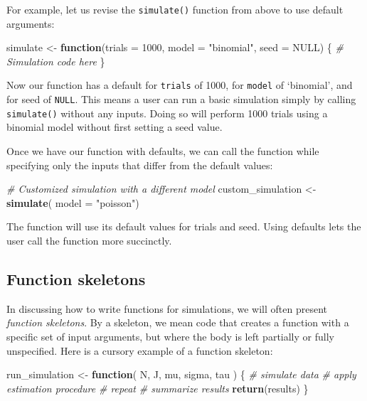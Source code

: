 \documentclass[
]{book}
\newenvironment{Shaded}{\begin{snugshade}}{\end{snugshade}}
\newcommand{\AttributeTok}[1]{\textcolor[rgb]{0.13,0.29,0.53}{#1}}
\newcommand{\CommentTok}[1]{\textcolor[rgb]{0.56,0.35,0.01}{\textit{#1}}}
\newcommand{\ConstantTok}[1]{\textcolor[rgb]{0.56,0.35,0.01}{#1}}
\newcommand{\ControlFlowTok}[1]{\textcolor[rgb]{0.13,0.29,0.53}{\textbf{#1}}}
\newcommand{\DecValTok}[1]{\textcolor[rgb]{0.00,0.00,0.81}{#1}}
\newcommand{\FunctionTok}[1]{\textcolor[rgb]{0.13,0.29,0.53}{\textbf{#1}}}
\newcommand{\NormalTok}[1]{#1}
\newcommand{\OtherTok}[1]{\textcolor[rgb]{0.56,0.35,0.01}{#1}}
\newcommand{\StringTok}[1]{\textcolor[rgb]{0.31,0.60,0.02}{#1}}
\begin{document}
For example, let us revise the \texttt{simulate()} function from above to use default arguments:

\begin{Shaded}
\begin{Highlighting}[]
\NormalTok{simulate }\OtherTok{\textless{}{-}} \ControlFlowTok{function}\NormalTok{(}\AttributeTok{trials =} \DecValTok{1000}\NormalTok{, }\AttributeTok{model =} \StringTok{"binomial"}\NormalTok{, }\AttributeTok{seed =} \ConstantTok{NULL}\NormalTok{) \{}
  \CommentTok{\# Simulation code here}
\NormalTok{\}}
\end{Highlighting}
\end{Shaded}

Now our function has a default for \texttt{trials} of 1000, for \texttt{model} of `binomial', and for seed of \texttt{NULL}.
This means a user can run a basic simulation simply by calling \texttt{simulate()} without any inputs. Doing so will perform 1000 trials using a binomial model without first setting a seed value.

Once we have our function with defaults, we can call the function while specifying only the inputs that differ from the default values:

\begin{Shaded}
\begin{Highlighting}[]
\CommentTok{\# Customized simulation with a different model}
\NormalTok{custom\_simulation }\OtherTok{\textless{}{-}} \FunctionTok{simulate}\NormalTok{( }\AttributeTok{model =} \StringTok{"poisson"}\NormalTok{)}
\end{Highlighting}
\end{Shaded}

The function will use its default values for trials and seed.
Using defaults lets the user call the function more succinctly.

\subsection{Function skeletons}\label{function-skeletons}

In discussing how to write functions for simulations, we will often present \emph{function skeletons}. By a skeleton, we mean code that creates a function with a specific set of input arguments, but where the body is left partially or fully unspecified.
Here is a cursory example of a function skeleton:

\begin{Shaded}
\begin{Highlighting}[]
\NormalTok{run\_simulation }\OtherTok{\textless{}{-}} \ControlFlowTok{function}\NormalTok{( N, J, mu, sigma, tau ) \{}
  \CommentTok{\# simulate data}
  \CommentTok{\# apply estimation procedure}
  \CommentTok{\# repeat}
  \CommentTok{\# summarize results}
  \FunctionTok{return}\NormalTok{(results)}
\NormalTok{\}}
\end{Highlighting}
\end{Shaded}
\end{document}

